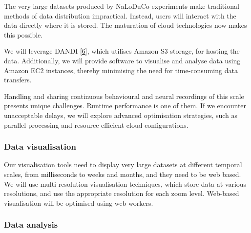 The very large datasets produced by NaLoDuCo experiments make traditional
methods of data distribution impractical. Instead, users will interact with the
data directly where it is stored. The maturation of cloud technologies now
makes this possible.

We will leverage DANDI [\href{https://www.dandiarchive.org/}{6}], which utilises
Amazon S3 storage, for hosting the data. Additionally, we will provide software
to visualise and analyse data using Amazon EC2 instances, thereby minimising
the need for time-consuming data transfers.

Handling and sharing continuous behavioural and neural recordings of this scale
presents unique challenges. Runtime performance is one of them. If we
encounter unacceptable delays, we will explore advanced optimisation
strategies, such as parallel processing and resource-efficient cloud
configurations.

\subsubsection{Data visualisation}

Our visualisation tools need to display very large datasets at different
temporal scales, from milliseconds to weeks and months, and they need to be web
based.
%
We will use multi-resolution visualisation techniques, which store data at
various resolutions, and use the appropriate resolution for each zoom level.
%
Web-based visualisation will be optimised using web workers.


%
%

\subsubsection{Data analysis}

